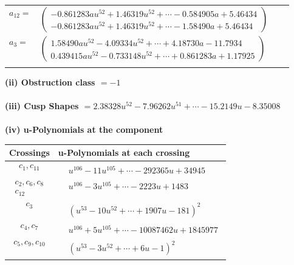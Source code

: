 \documentclass[1p]{elsarticle_modified}
\theoremstyle{definition}
\begin{document}
\begin{tabular}{m{7pt} m{180pt} m{7pt} m{180pt} }
\flushright $a_{12}=$&$\begin{pmatrix}-0.861283 a u^{52}+1.46319 u^{52}+\cdots-0.584905 a+5.46434\\-0.861283 a u^{52}+1.46319 u^{52}+\cdots-1.58490 a+5.46434\end{pmatrix}$ \\
\flushright $a_{3}=$&$\begin{pmatrix}1.58490 a u^{52}-4.09334 u^{52}+\cdots+4.18730 a-11.7934\\0.439415 a u^{52}-0.733148 u^{52}+\cdots+0.861283 a+1.17925\end{pmatrix}$\\&\end{tabular}
\flushleft \textbf{(ii) Obstruction class $= -1$}\\~\\
\flushleft \textbf{(iii) Cusp Shapes $= 2.38328 u^{52}-7.96262 u^{51}+\cdots-15.2149 u-8.35008$}\\~\\
\newpage\renewcommand{\arraystretch}{1}
\flushleft \textbf{(iv) u-Polynomials at the component}\newline \\
\begin{tabular}{m{50pt}|m{274pt}}
Crossings & \hspace{64pt}u-Polynomials at each crossing \\
\hline $$\begin{aligned}c_{1},c_{11}\end{aligned}$$&$\begin{aligned}
&u^{106}-11 u^{105}+\cdots-292365 u+34945
\end{aligned}$\\
\hline $$\begin{aligned}c_{2},c_{6},c_{8}\\c_{12}\end{aligned}$$&$\begin{aligned}
&u^{106}-3 u^{105}+\cdots-2223 u+1483
\end{aligned}$\\
\hline $$\begin{aligned}c_{3}\end{aligned}$$&$\begin{aligned}
&(u^{53}-10 u^{52}+\cdots+1907 u-181)^{2}
\end{aligned}$\\
\hline $$\begin{aligned}c_{4},c_{7}\end{aligned}$$&$\begin{aligned}
&u^{106}+5 u^{105}+\cdots-10087462 u+1845977
\end{aligned}$\\
\hline $$\begin{aligned}c_{5},c_{9},c_{10}\end{aligned}$$&$\begin{aligned}
&(u^{53}-3 u^{52}+\cdots+6 u-1)^{2}
\end{aligned}$\\
\hline
\end{tabular}\\~\\
\end{document}
